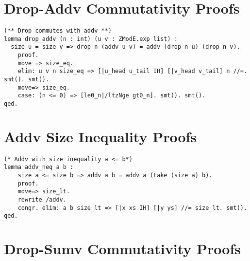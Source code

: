 \section{Drop-Addv Commutativity Proofs}
\label{sec:drop-addv-proofs}

\begin{lstlisting}[style=easycrypt, caption=Proof of Drop-Addv Commutativity, breaklines=true, breakatwhitespace=true, frame=single, keepspaces=true]
(** Drop commutes with addv **)
lemma drop_addv (n : int) (u v : ZModE.exp list) :
  size u = size v => drop n (addv u v) = addv (drop n u) (drop n v).
    proof.
    move => size_eq.
    elim: u v n size_eq => [|u_head u_tail IH] [|v_head v_tail] n //=. smt(). smt().
    move=> size_eq.
    case: (n <= 0) => [le0_n|/ltzNge gt0_n]. smt(). smt().
qed.
\end{lstlisting}

\section{Addv Size Inequality Proofs}
\label{sec:addv-neq-proofs}

\begin{lstlisting}[style=easycrypt, caption=Proof of Addv Size Inequality, breaklines=true, breakatwhitespace=true, frame=single, keepspaces=true]
(* Addv with size inequality a <= b*)
lemma addv_neq a b :
    size a <= size b => addv a b = addv a (take (size a) b).
    proof.
    move=> size_lt.
    rewrite /addv. 
    congr. elim: a b size_lt => [|x xs IH] [|y ys] //= size_lt. smt().
qed.
\end{lstlisting}

\section{Drop-Sumv Commutativity Proofs}
\label{sec:drop-sumv-proofs}

